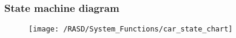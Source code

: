 \subsubsection{State machine diagram}
\begin{figure}[!ht]
  \centering
  \vspace{0.2cm}
  \texttt{[image: /RASD/System\_Functions/car\_state\_chart]}\\
  \vspace{0.4cm}
  \label{fig:car_state_chart} 
\end{figure}
